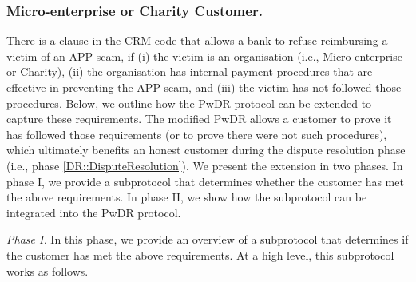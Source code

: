\subsubsection{Micro-enterprise or Charity Customer.} There is a clause in the CRM code that  allows a bank to refuse reimbursing a victim of an APP scam, if (i) the victim is an organisation (i.e., Micro-enterprise or Charity), (ii) the organisation has internal payment procedures that are effective in preventing the APP scam, and (iii) the victim has not followed those procedures. Below, we outline how the PwDR protocol can be extended to capture these requirements. The modified PwDR allows a customer to prove it has followed those requirements (or to prove there were not such  procedures), which ultimately benefits an honest customer during the dispute resolution phase (i.e., phase \ref{DR::DisputeResolution}).   We present the extension in two phases. In phase I, we provide a subprotocol that determines whether the customer has met the above requirements. In phase II, we show how the subprotocol can be integrated into the PwDR protocol.  

\noindent\textit{{Phase I.}} In this phase, we provide an overview of a  subprotocol that determines if the customer has met the above requirements. At a high level, this subprotocol works as follows.


